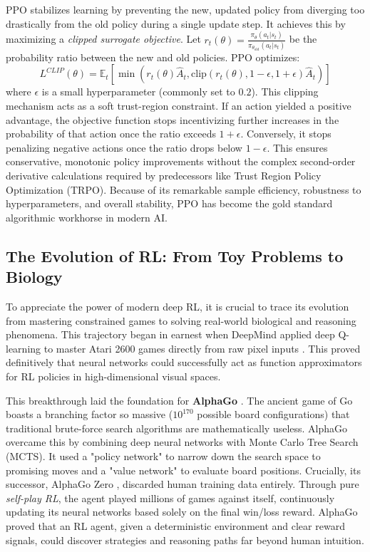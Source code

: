 \documentclass{l4proj}
\begin{document}
PPO stabilizes learning by preventing the new, updated policy from diverging too drastically from the old policy during a single update step. It achieves this by maximizing a \textit{clipped surrogate objective}. Let $r_t(\theta) = \frac{\pi_\theta(a_t|s_t)}{\pi_{\theta_{\text{old}}}(a_t|s_t)}$ be the probability ratio between the new and old policies. PPO optimizes:
\begin{equation}
    L^{CLIP}(\theta) = \mathbb{E}_{t} \left[ \min\left(r_t(\theta)\hat{A}_t, \text{clip}(r_t(\theta), 1-\epsilon, 1+\epsilon)\hat{A}_t\right) \right]
\end{equation}
where $\epsilon$ is a small hyperparameter (commonly set to $0.2$). This clipping mechanism acts as a soft trust-region constraint. If an action yielded a positive advantage, the objective function stops incentivizing further increases in the probability of that action once the ratio exceeds $1+\epsilon$. Conversely, it stops penalizing negative actions once the ratio drops below $1-\epsilon$. This ensures conservative, monotonic policy improvements without the complex second-order derivative calculations required by predecessors like Trust Region Policy Optimization (TRPO). Because of its remarkable sample efficiency, robustness to hyperparameters, and overall stability, PPO has become the gold standard algorithmic workhorse in modern AI.

\subsection{The Evolution of RL: From Toy Problems to Biology}
To appreciate the power of modern deep RL, it is crucial to trace its evolution from mastering constrained games to solving real-world biological and reasoning phenomena. This trajectory began in earnest when DeepMind applied deep Q-learning to master Atari 2600 games directly from raw pixel inputs \citep{mnih2015human}. This proved definitively that neural networks could successfully act as function approximators for RL policies in high-dimensional visual spaces.

This breakthrough laid the foundation for \textbf{AlphaGo} \citep{silver2016mastering}. The ancient game of Go boasts a branching factor so massive ($10^{170}$ possible board configurations) that traditional brute-force search algorithms are mathematically useless. AlphaGo overcame this by combining deep neural networks with Monte Carlo Tree Search (MCTS). It used a "policy network" to narrow down the search space to promising moves and a "value network" to evaluate board positions. Crucially, its successor, AlphaGo Zero \citep{silver2017mastering}, discarded human training data entirely. Through pure \textit{self-play RL}, the agent played millions of games against itself, continuously updating its neural networks based solely on the final win/loss reward. AlphaGo proved that an RL agent, given a deterministic environment and clear reward signals, could discover strategies and reasoning paths far beyond human intuition.
\end{document}
